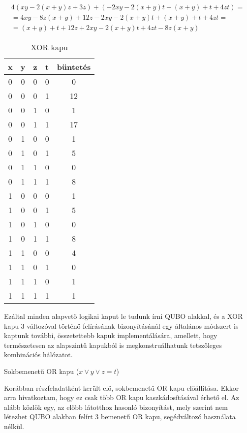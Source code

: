 \begin{align}
	4(xy-2(x+y)z+3z)+(-2xy-2(x+y)t+(x+y)+t+4zt) = \\
    = 4xy-8z(x+y)+12z-2xy-2(x+y)t+(x+y)+t+4zt = \\
	= (x+y)+t+12z+2xy-2(x+y)t+4zt-8z(x+y)
\end{align}

\begin{table}[ht]
	\footnotesize
	\centering
	\begin{tabular}{ c c c c c }
		\toprule
		x & y & z & t & büntetés \\
		\midrule
		0 & 0 & 0 & 0 & 0 \\
		0 & 0 & 0 & 1 & 12 \\
		0 & 0 & 1 & 0 & 1 \\
		0 & 0 & 1 & 1 & 17 \\
		0 & 1 & 0 & 0 & 1 \\
		0 & 1 & 0 & 1 & 5 \\
		0 & 1 & 1 & 0 & 0 \\
		0 & 1 & 1 & 1 & 8 \\		
		1 & 0 & 0 & 0 & 1 \\
		1 & 0 & 0 & 1 & 5 \\
		1 & 0 & 1 & 0 & 0 \\
		1 & 0 & 1 & 1 & 8 \\
		1 & 1 & 0 & 0 & 4 \\
		1 & 1 & 0 & 1 & 0 \\
		1 & 1 & 1 & 0 & 1 \\
		1 & 1 & 1 & 1 & 1 \\		
		\bottomrule
	\end{tabular}
	\caption{XOR kapu}
	\label{tab:XORgate}
\end{table}

Ezáltal minden alapvető logikai kaput le tudunk írni QUBO alakkal, és a XOR kapu 3 változóval történő felírásának bizonyításánál egy általános módszert is kaptunk további, összetettebb kapuk implementálására, amellett, hogy természetesen az alapszintű kapukból is megkonstruálhatunk tetszőleges kombinációs hálózatot.

Sokbemenetű OR kapu ($x \vee y \vee z = t$)

Korábban részfeladatként került elő, sokbemenetű OR kapu előállítása. Ekkor arra hivatkoztam, hogy ez csak több OR kapu kaszkádosításával érhető el. Az alább közlök egy, az előbb látotthoz hasonló bizonyítást, mely szerint nem létezhet QUBO alakban felírt 3 bemenetű OR kapu, segédváltozó használata nélkül.

